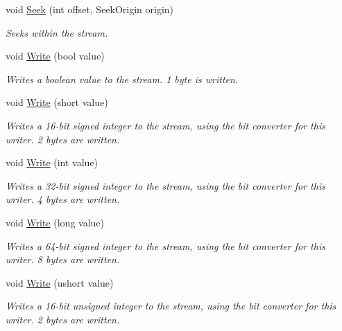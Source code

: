 \begin{DoxyCompactItemize}
void \mbox{\hyperlink{class_t_net_1_1_i_o_1_1_endian_binary_writer_a6d8eafe0d496d74d19ef83fc9f5ec8bf}{Seek}} (int offset, Seek\+Origin origin)
\begin{DoxyCompactList}\small\item\em Seeks within the stream. \end{DoxyCompactList}\item 
void \mbox{\hyperlink{class_t_net_1_1_i_o_1_1_endian_binary_writer_a52b49263c5a6784ef18a9494bdfeac47}{Write}} (bool value)
\begin{DoxyCompactList}\small\item\em Writes a boolean value to the stream. 1 byte is written. \end{DoxyCompactList}\item 
void \mbox{\hyperlink{class_t_net_1_1_i_o_1_1_endian_binary_writer_a9582cfc803bd67c7b183d7c8c139b033}{Write}} (short value)
\begin{DoxyCompactList}\small\item\em Writes a 16-\/bit signed integer to the stream, using the bit converter for this writer. 2 bytes are written. \end{DoxyCompactList}\item 
void \mbox{\hyperlink{class_t_net_1_1_i_o_1_1_endian_binary_writer_aed3d83ac90ac9124864072acb22e0833}{Write}} (int value)
\begin{DoxyCompactList}\small\item\em Writes a 32-\/bit signed integer to the stream, using the bit converter for this writer. 4 bytes are written. \end{DoxyCompactList}\item 
void \mbox{\hyperlink{class_t_net_1_1_i_o_1_1_endian_binary_writer_ac00e25e106c3d5d83b9ae0b615304325}{Write}} (long value)
\begin{DoxyCompactList}\small\item\em Writes a 64-\/bit signed integer to the stream, using the bit converter for this writer. 8 bytes are written. \end{DoxyCompactList}\item 
void \mbox{\hyperlink{class_t_net_1_1_i_o_1_1_endian_binary_writer_a5df654e5cc0a63088b5a38c1f63c81ba}{Write}} (ushort value)
\begin{DoxyCompactList}\small\item\em Writes a 16-\/bit unsigned integer to the stream, using the bit converter for this writer. 2 bytes are written. \end{DoxyCompactList}\item 

\end{DoxyCompactItemize}
